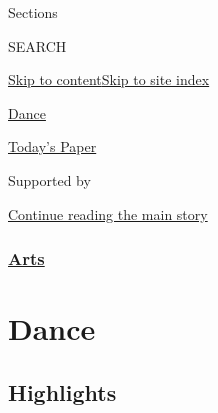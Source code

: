 Sections

SEARCH

\protect\hyperlink{site-content}{Skip to
content}\protect\hyperlink{site-index}{Skip to site index}

\href{https://www.nytimes3xbfgragh.onion/section/arts/dance}{Dance}

\href{https://myaccount.nytimes3xbfgragh.onion/auth/login?response_type=cookie\&client_id=vi}{}

\href{https://www.nytimes3xbfgragh.onion/section/todayspaper}{Today's
Paper}

Supported by

\protect\hyperlink{after-sponsor}{Continue reading the main story}

\hypertarget{arts}{%
\subsubsection{\texorpdfstring{\href{/section/arts}{Arts}}{Arts}}\label{arts}}

\hypertarget{dance}{%
\section{Dance}\label{dance}}

\hypertarget{highlights}{%
\subsection{Highlights}\label{highlights}}

